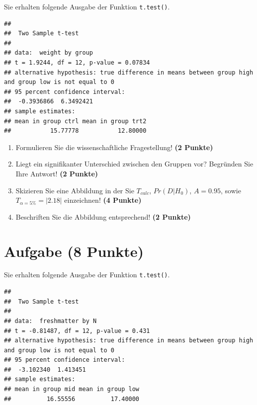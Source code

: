 \documentclass[a4paper, 10pt]{scrartcl}\usepackage[]{graphicx}\usepackage[]{xcolor}
\makeatletter
\newenvironment{kframe}{%
 \def\at@end@of@kframe{}%
 \ifinner\ifhmode%
  \def\at@end@of@kframe{\end{minipage}}%
  \begin{minipage}{\columnwidth}%
 \fi\fi%
 \def\FrameCommand##1{\hskip\@totalleftmargin \hskip-\fboxsep
 \colorbox{shadecolor}{##1}\hskip-\fboxsep
     \hskip-\linewidth \hskip-\@totalleftmargin \hskip\columnwidth}%
 \MakeFramed {\advance\hsize-\width
   \@totalleftmargin\z@ \linewidth\hsize
   \@setminipage}}%
 {\par\unskip\endMakeFramed%
 \at@end@of@kframe}
\newenvironment{knitrout}{}{} %
\makeatother
\begin{document}
Sie erhalten folgende \Rlogo Ausgabe der Funktion \texttt{t.test()}.

\begin{knitrout}
\color{fgcolor}\begin{kframe}
\begin{verbatim}
## 
## 	Two Sample t-test
## 
## data:  weight by group
## t = 1.9244, df = 12, p-value = 0.07834
## alternative hypothesis: true difference in means between group high and group low is not equal to 0
## 95 percent confidence interval:
##  -0.3936866  6.3492421
## sample estimates:
## mean in group ctrl mean in group trt2 
##           15.77778           12.80000
\end{verbatim}
\end{kframe}
\end{knitrout}


\begin{enumerate}
  \item Formulieren Sie die wissenschaftliche Fragestellung! \textbf{(2
Punkte)}
\item Liegt ein signifikanter Unterschied zwischen den Gruppen vor?
  Begr{\"u}nden Sie Ihre Antwort! \textbf{(2 Punkte)}
\item Skizieren Sie eine Abbildung in der Sie $T_{calc}$, $Pr(D|H_0)$, $A=0.95$,
  sowie $T_{\alpha=5\%} = |2.18|$ einzeichnen! \textbf{(4 Punkte)}
\item Beschriften Sie die Abbildung entsprechend! \textbf{(2 Punkte)}  
\end{enumerate} 
\clearpage

\section{Aufgabe \hfill (8 Punkte)}

Sie erhalten folgende \Rlogo Ausgabe der Funktion \texttt{t.test()}.

\begin{knitrout}
\color{fgcolor}\begin{kframe}
\begin{verbatim}
## 
## 	Two Sample t-test
## 
## data:  freshmatter by N
## t = -0.81487, df = 12, p-value = 0.431
## alternative hypothesis: true difference in means between group high and group low is not equal to 0
## 95 percent confidence interval:
##  -3.102340  1.413451
## sample estimates:
## mean in group mid mean in group low 
##          16.55556          17.40000
\end{verbatim}
\end{kframe}
\end{knitrout}
\end{document}
